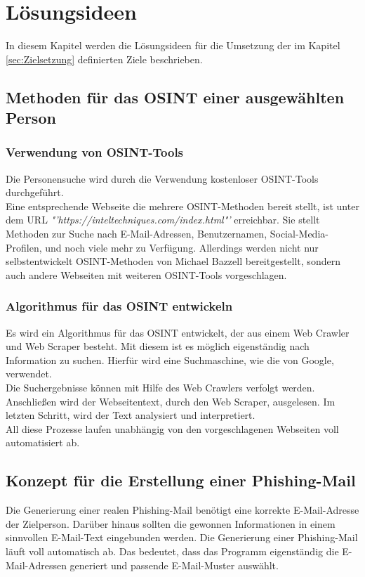
\chapter{Lösungsideen}  %
\label{cha:Lösungsideen} %
In diesem Kapitel werden die Lösungsideen für die Umsetzung der im Kapitel \ref{sec:Zielsetzung} definierten Ziele beschrieben.

\section{Methoden für das OSINT einer ausgewählten Person}
	\subsection{Verwendung von OSINT-Tools}
	Die Personensuche wird durch die Verwendung kostenloser OSINT-Tools durchgeführt.\\ 
	Eine entsprechende Webseite die mehrere OSINT-Methoden bereit stellt, ist unter dem URL \textit{"'https://inteltechniques.com/index.html"'} erreichbar. Sie stellt Methoden zur Suche nach E-Mail-Adressen, Benutzernamen, Social-Media-Profilen, und noch viele mehr zu Verfügung. Allerdings werden nicht nur selbstentwickelt OSINT-Methoden von Michael Bazzell bereitgestellt, sondern auch andere Webseiten mit weiteren OSINT-Tools vorgeschlagen.
	
	\subsection{Algorithmus für das OSINT entwickeln}
	Es wird ein Algorithmus für das OSINT entwickelt, der aus einem Web Crawler und Web Scraper besteht. Mit diesem ist es möglich eigenständig nach Information zu suchen. Hierfür wird eine Suchmaschine, wie die von Google, verwendet.\\
	Die Suchergebnisse können mit Hilfe des Web Crawlers verfolgt werden. Anschließen wird der Webseitentext, durch den Web Scraper, ausgelesen. Im letzten Schritt, wird der Text analysiert und interpretiert.\\
	All diese Prozesse laufen unabhängig von den vorgeschlagenen Webseiten voll automatisiert ab.

	
\section{Konzept für die Erstellung einer Phishing-Mail}
Die Generierung einer realen Phishing-Mail benötigt eine korrekte E-Mail-Adresse der Zielperson. Darüber hinaus sollten die gewonnen Informationen in einem sinnvollen E-Mail-Text eingebunden werden. Die Generierung einer Phishing-Mail läuft voll automatisch ab. Das bedeutet, dass das Programm eigenständig die E-Mail-Adressen generiert und passende E-Mail-Muster auswählt.
	
